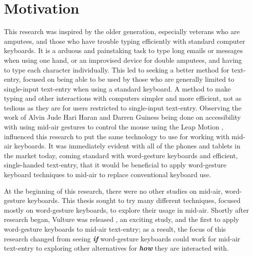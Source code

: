 \section{Motivation}
This research was inspired by the older generation, especially veterans who are amputees, and those who have trouble typing efficiently with standard computer keyboards. It is a arduous and painstaking task to type long emails or messages when using one hand, or an improvised device for double amputees, and having to type each character individually. This led to seeking a better method for text-entry, focused on being able to be used by those who are generally limited to single-input text-entry when using a standard keyboard. A method to make typing and other interactions with computers simpler and more efficient, not as tedious as they are for users restricted to single-input text-entry. Observing the work of Alvin Jude Hari Haran and Darren Guiness being done on accessibility with using mid-air gestures to control the mouse using the Leap Motion \cite{ref_leap_motion,ref_alvin_thesis,ref_darren_thesis}, influenced this research to put the same technology to use for working with mid-air keyboards. It was immediately evident with all of the phones and tablets in the market today, coming standard with word-gesture keyboards and efficient, single-handed text-entry, that it would be beneficial to apply word-gesture keyboard techniques to mid-air to replace conventional keyboard use.

At the beginning of this research, there were no other studies on mid-air, word-gesture keyboards. This thesis sought to try many different techniques, focused mostly on word-gesture keyboards, to explore their usage in mid-air. Shortly after research began, Vulture was released \cite{ref_vulture}, an exciting study, and the first to apply word-gesture keyboards to mid-air text-entry; as a result, the focus of this research changed from seeing \textbf{\textit{if}} word-gesture keyboards could work for mid-air text-entry to exploring other alternatives for \textbf{\textit{how}} they are interacted with.